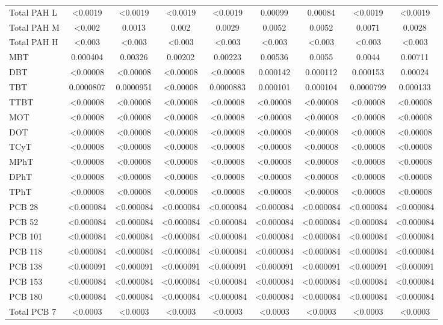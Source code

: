 \documentclass[algorithms,article,submit,pdftex,moreauthors]{Definitions/mdpi}
\begin{document}
\begin{scriptsize}
\begin{center}
\begin{longtable}{@{\extracolsep{\fill}}|p{1.8cm}|cccccccc|@{}}
Total PAH L & <0.0019 & <0.0019 & <0.0019 & <0.0019 & 0.00099 & 0.00084 & <0.0019 & <0.0019  \\
Total PAH M & <0.002 & 0.0013 & 0.002 & 0.0029 & 0.0052 & 0.0052 & 0.0071 & 0.0028  \\
Total PAH H & <0.003 & <0.003 & <0.003 & <0.003 & <0.003 & <0.003 & <0.003 & <0.003  \\
MBT & 0.000404 & 0.00326 & 0.00202 & 0.00223 & 0.00536 & 0.0055 & 0.0044 & 0.00711 \\
DBT & <0.00008 & <0.00008 & <0.00008 & <0.00008 & 0.000142 & 0.000112 & 0.000153 & 0.00024 \\
TBT & 0.0000807 & 0.0000951 & <0.00008 & 0.0000883 & 0.000101 & 0.000104 & 0.0000799 & 0.000133 \\
TTBT & <0.00008 & <0.00008 & <0.00008 & <0.00008 & <0.00008 & <0.00008 & <0.00008 & <0.00008 \\
MOT & <0.00008 & <0.00008 & <0.00008 & <0.00008 & <0.00008 & <0.00008 & <0.00008 & <0.00008 \\
DOT & <0.00008 & <0.00008 & <0.00008 & <0.00008 & <0.00008 & <0.00008 & <0.00008 & <0.00008 \\
TCyT & <0.00008 & <0.00008 & <0.00008 & <0.00008 & <0.00008 & <0.00008 & <0.00008 & <0.00008 \\
MPhT &  <0.00008 &  <0.00008 &  <0.00008 &  <0.00008 &  <0.00008 &  <0.00008 &  <0.00008 &  <0.00008 \\
DPhT & <0.00008 & <0.00008 & <0.00008 & <0.00008 & <0.00008 & <0.00008 & <0.00008 & <0.00008  \\
TPhT &  <0.00008 &  <0.00008 &  <0.00008 &  <0.00008 &  <0.00008 &  <0.00008 &  <0.00008 &  <0.00008 \\
PCB 28 & <0.000084 & <0.000084 & <0.000084 & <0.000084 & <0.000084 & <0.000084 & <0.000084 & <0.000084 \\
PCB 52 & <0.000084 & <0.000084 & <0.000084 & <0.000084 & <0.000084 & <0.000084 & <0.000084 & <0.000084 \\
PCB 101 & <0.000084 & <0.000084 & <0.000084 & <0.000084 & <0.000084 & <0.000084 & <0.000084 & <0.000084  \\
PCB 118 & <0.000084 & <0.000084 & <0.000084 & <0.000084 & <0.000084 & <0.000084 & <0.000084 & <0.000084  \\
PCB 138 & <0.000091 & <0.000091 & <0.000091 & <0.000091 & <0.000091 & <0.000091 & <0.000091 & <0.000091  \\
PCB 153 & <0.000084 & <0.000084 & <0.000084 & <0.000084 & <0.000084 & <0.000084 & <0.000084 & <0.000084  \\
PCB 180  & <0.000084 & <0.000084 & <0.000084 & <0.000084 & <0.000084 & <0.000084 & <0.000084 & <0.000084  \\
Total PCB 7 & <0.0003 & <0.0003 & <0.0003 & <0.0003 & <0.0003 & <0.0003 & <0.0003 & <0.0003  \\
%

\end{longtable}
\end{center}
\end{scriptsize}
\end{document}
